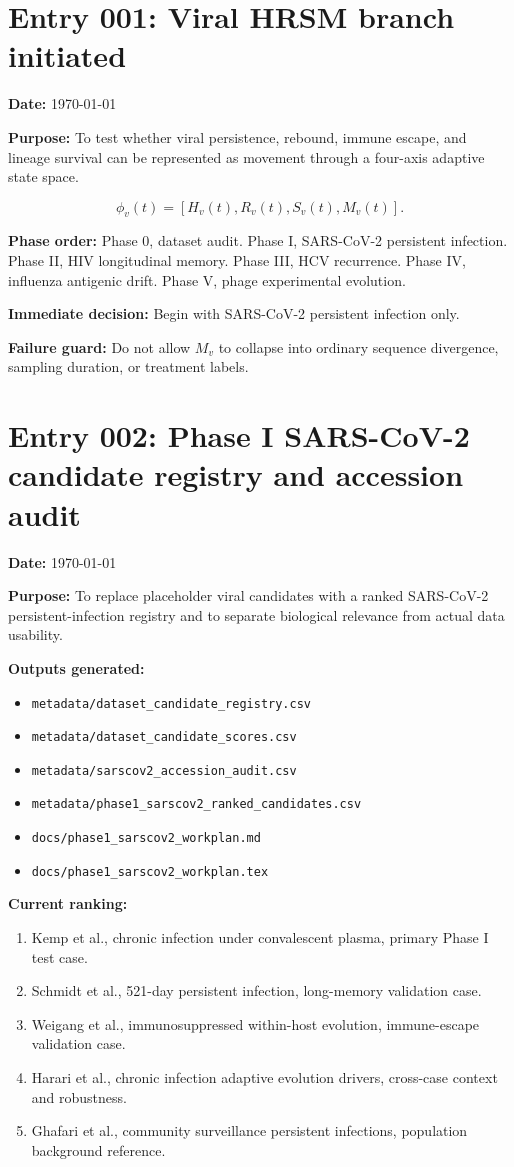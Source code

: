 \section*{Entry 001: Viral HRSM branch initiated}

\textbf{Date:} \today

\textbf{Purpose:} To test whether viral persistence, rebound, immune escape, and lineage survival can be represented as movement through a four-axis adaptive state space.

\[
\phi_v(t) = [H_v(t), R_v(t), S_v(t), M_v(t)].
\]

\textbf{Phase order:}
Phase 0, dataset audit.
Phase I, SARS-CoV-2 persistent infection.
Phase II, HIV longitudinal memory.
Phase III, HCV recurrence.
Phase IV, influenza antigenic drift.
Phase V, phage experimental evolution.

\textbf{Immediate decision:} Begin with SARS-CoV-2 persistent infection only.

\textbf{Failure guard:} Do not allow \(M_v\) to collapse into ordinary sequence divergence, sampling duration, or treatment labels.

\section*{Entry 002: Phase I SARS-CoV-2 candidate registry and accession audit}

\textbf{Date:} \today

\textbf{Purpose:} To replace placeholder viral candidates with a ranked SARS-CoV-2 persistent-infection registry and to separate biological relevance from actual data usability.

\textbf{Outputs generated:}
\begin{itemize}
    \item \texttt{metadata/dataset\_candidate\_registry.csv}
    \item \texttt{metadata/dataset\_candidate\_scores.csv}
    \item \texttt{metadata/sarscov2\_accession\_audit.csv}
    \item \texttt{metadata/phase1\_sarscov2\_ranked\_candidates.csv}
    \item \texttt{docs/phase1\_sarscov2\_workplan.md}
    \item \texttt{docs/phase1\_sarscov2\_workplan.tex}
\end{itemize}

\textbf{Current ranking:}
\begin{enumerate}
    \item Kemp et al., chronic infection under convalescent plasma, primary Phase I test case.
    \item Schmidt et al., 521-day persistent infection, long-memory validation case.
    \item Weigang et al., immunosuppressed within-host evolution, immune-escape validation case.
    \item Harari et al., chronic infection adaptive evolution drivers, cross-case context and robustness.
    \item Ghafari et al., community surveillance persistent infections, population background reference.
\end{enumerate}


